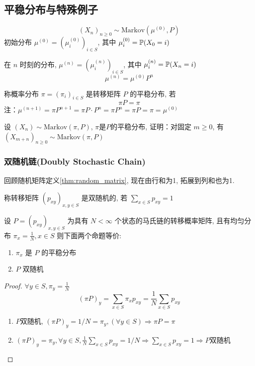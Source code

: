 \subsection{平稳分布与特殊例子}

\[
(X_n)_{n\geq 0}\sim \text{Markov}(\mu^{(0)},P)
\]
初始分布 $\mu^{(0)}=(\mu_i^{(0)})_{i\in S}$, 其中 $\mu_i^{(0)}=\mathbb{P}(X_0=i)$

在 $n$ 时刻的分布, $\mu^{(n)}=(\mu_i^{(n)})_{i\in S}$, 其中 $\mu_i^{(n)}=\mathbb{P}(X_n=i)$
\[
\mu^{(n)}=\mu^{(0)}P^n
\]
\begin{definition}[平稳分布]
    称概率分布 $\pi=(\pi_i)_{i\in S}$ 是转移矩阵 $P$ 的平稳分布, 若
    \begin{equation}
        \pi P=\pi
        \label{eq:stationary}
    \end{equation}
    注：$\mu^{(n+1)}=\pi P^{n+1}=\pi P\cdot P^n=\pi P^n=\pi P=\pi=\mu^{(0)}$
\end{definition}

\begin{problem}[作业6-4]
    设 $(X_n)\sim \text{Markov}(\pi,P)$, $\pi$是$P$的平稳分布, 证明：对固定 $m\geq 0$, 有 $(X_{m+n})_{n\geq 0}\sim \text{Markov}(\pi,P)$
\end{problem}

\subsubsection{双随机链(Doubly Stochastic Chain)}

回顾随机矩阵定义\ref{thm:random_matrix}, 现在由行和为1, 拓展到列和也为1.

\begin{definition}
    称转移矩阵 $(p_{xy})_{x,y\in S}$ 是双随机的, 若 $\sum_{x\in S}p_{xy}=1$
\end{definition}

\begin{theorem}
    设 $P=(p_{xy})_{x,y\in S}$ 为具有 $N<\infty$ 个状态的马氏链的转移概率矩阵, 且有均匀分布 $\pi_x=\frac{1}{N},x\in S$ 则下面两个命题等价:
\begin{enumerate}
\item $\pi_x$ 是 $P$ 的平稳分布
\item $P$ 双随机
\end{enumerate} 
\end{theorem}

\begin{proof}
$\forall y\in S,\pi_y=\frac{1}{N}$
\[
(\pi P)_y=\sum_{x\in S}\pi_x p_{xy}=\frac{1}{N}\sum_{x\in S}p_{xy}
\]
\begin{enumerate}
    \item $P$双随机, $(\pi P)_y=1/N=\pi_y,(\forall y\in S)\Rightarrow \pi P=\pi$
    \item $(\pi P)_y=\pi_y,\forall y\in S,\frac{1}{N}\sum_{x\in S}p_{xy}=1/N \Rightarrow \sum_{x\in S}p_{xy}=1\Rightarrow P$双随机
\end{enumerate}
\end{proof}

